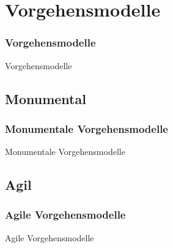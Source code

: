 \section{Vorgehensmodelle}
\begin{frame}[fragile]
	\frametitle{Vorgehensmodelle}
\huge Vorgehensmodelle
\end{frame}

\subsection{Monumental}
\begin{frame}[fragile]
	\frametitle{Monumentale Vorgehensmodelle}
\huge Monumentale Vorgehensmodelle
\end{frame}

\subsection{Agil}
\begin{frame}[fragile]
	\frametitle{Agile Vorgehensmodelle}
\huge Agile Vorgehensmodelle
\end{frame}
